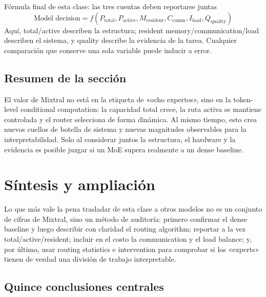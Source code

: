 \documentclass[a4paper]{article}
\begin{document}
\begin{importantbox}{Fórmula final de esta clase: las tres cuentas deben reportarse juntas}
\[
\boxed{\text{Model decision}=f(P_{\text{total}},P_{\text{active}},M_{\text{resident}},C_{\text{comm}},I_{\text{load}},Q_{\text{quality}})}
\]
Aquí, total/active describen la estructura; resident memory/communication/load describen el sistema, y quality describe la evidencia de la tarea. Cualquier comparación que conserve una sola variable puede inducir a error.
\end{importantbox}


\subsection{Resumen de la sección}

El valor de Mixtral no está en la etiqueta de «ocho expertos», sino en la token-level conditional computation: la capacidad total crece, la ruta activa se mantiene controlada y el router selecciona de forma dinámica. Al mismo tiempo, esto crea nuevos cuellos de botella de sistema y nuevas magnitudes observables para la interpretabilidad. Solo al considerar juntos la estructura, el hardware y la evidencia es posible juzgar si un MoE supera realmente a un dense baseline.
\section{Síntesis y ampliación}

Lo que más vale la pena trasladar de esta clase a otros modelos no es un conjunto de cifras de Mixtral, sino un método de auditoría: primero confirmar el dense baseline y luego describir con claridad el routing algorithm; reportar a la vez total/active/resident; incluir en el costo la communication y el load balance; y, por último, usar routing statistics e intervention para comprobar si los «experts» tienen de verdad una división de trabajo interpretable.

\subsection{Quince conclusiones centrales}
\end{document}
